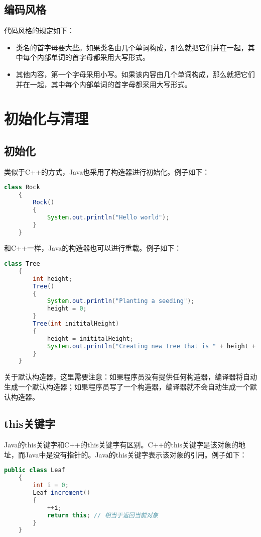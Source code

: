 \documentclass[a4paper,left=2.5cm,right=2.5cm,11pt]{article}
\begin{document}
\subsection{编码风格}
	代码风格的规定如下：
	\begin{itemize}
		\item 类名的首字母要大些。如果类名由几个单词构成，那么就把它们并在一起，其中每个内部单词的首字母都采用大写形式。
		\item 其他内容，第一个字母采用小写。如果该内容由几个单词构成，那么就把它们并在一起，其中每个内部单词的首字母都采用大写形式。
	\end{itemize}

\section{初始化与清理}
\subsection{初始化}
	类似于C++的方式，Java也采用了构造器进行初始化。例子如下：
	\begin{lstlisting}[language = Java]
	class Rock
	{
		Rock()
		{
			System.out.println("Hello world");
		}
	}
	\end{lstlisting}

	和C++一样，Java的构造器也可以进行重载。例子如下：
	\begin{lstlisting}[language = Java]
	class Tree
	{
		int height;
		Tree()
		{
			System.out.println("Planting a seeding");
			height = 0;
		}
		Tree(int inititalHeight)
		{
			height = inititalHeight;
			System.out.println("Creating new Tree that is " + height + " feer tall");
		}
	}
	\end{lstlisting}

	关于默认构造器，这里需要注意：如果程序员没有提供任何构造器，编译器将自动生成一个默认构造器；如果程序员写了一个构造器，编译器就不会自动生成一个默认构造器。

\subsection{this关键字}
	Java的this关键字和C++的this关键字有区别。C++的this关键字是该对象的地址，而Java中是没有指针的。Java的this关键字表示该对象的引用。例子如下：
	\begin{lstlisting}[language = Java]
	public class Leaf
	{
		int i = 0;
		Leaf increment()
		{
			++i;
			return this; // 相当于返回当前对象
		}
	}
	\end{lstlisting}
\end{document}
